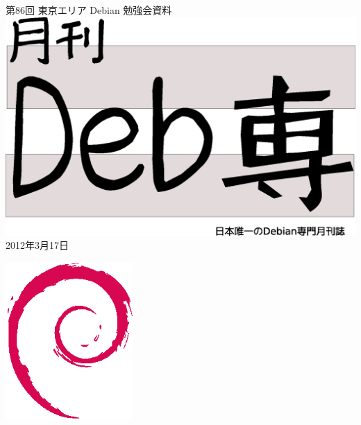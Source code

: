 \documentclass[mingoth,a4paper]{jsarticle}
\newcommand{\debmtgyear}{2012}
\newcommand{\debmtgmonth}{3}
\newcommand{\debmtgdate}{17}
\newcommand{\debmtgnumber}{86}
\begin{document}
\begin{titlepage}
\thispagestyle{empty}

\vspace*{-2cm}
第\debmtgnumber{}回 東京エリア Debian 勉強会資料\\
\hspace*{-2cm}
\includegraphics[width=210mm]{image201003/debsen.eps}\\
\hfill{}\debmtgyear{}年\debmtgmonth{}月\debmtgdate{}日



\vspace*{-2cm}
\hfill{}\includegraphics[height=6cm]{image200502/openlogo-nd.eps}
\end{titlepage}

\end{document}
